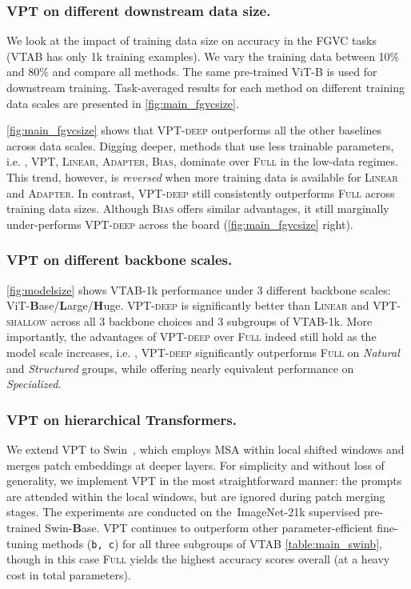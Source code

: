 \subsubsection{VPT on different downstream data size.}
\label{para:exp_datasize}
We look at the impact of training data size on accuracy in the FGVC tasks (VTAB has only 1k training examples). We vary the training data between 10\% and 80\% and compare all methods. The same pre-trained ViT-B is used for downstream training. Task-averaged results for each method on different training data scales are presented in \ref{fig:main_fgvcsize}.

\ref{fig:main_fgvcsize} shows that \textsc{VPT}-\textsc{deep} outperforms all the other baselines across data scales. Digging deeper, methods that use less trainable parameters, i.e. , \textsc{VPT}, \textsc{Linear}, \textsc{Adapter}, \textsc{Bias}, dominate over \textsc{Full} in the low-data regimes. This trend, however, is \emph{reversed} when more training data is available for \textsc{Linear} and \textsc{Adapter}. 
In contrast, \textsc{VPT}-\textsc{deep} still consistently outperforms \textsc{Full} across training data sizes. Although \textsc{Bias} offers similar advantages, it still marginally under-performs \textsc{VPT}-\textsc{deep} across the board (\ref{fig:main_fgvcsize} right).

\subsubsection{VPT on different backbone scales.}
\ref{fig:modelsize} shows VTAB-1k performance under 3 different backbone scales: ViT-\textbf{B}ase/\textbf{L}arge/\textbf{H}uge.
\textsc{VPT}-\textsc{deep} is significantly better than \textsc{Linear} and \textsc{VPT}-\textsc{shallow} across all 3 backbone choices and 3 subgroups of VTAB-1k. More importantly, the advantages of \textsc{VPT}-\textsc{deep} over \textsc{Full} indeed still hold as the model scale increases, i.e. , \textsc{VPT}-\textsc{deep} significantly outperforms \textsc{Full} on \textit{Natural} and \textit{Structured} groups, while offering nearly equivalent performance on \textit{Specialized}.

\subsubsection{VPT on hierarchical Transformers.} We extend \textsc{VPT} to Swin~\cite{liu2021swin}, which employs MSA within local shifted windows and merges patch embeddings at deeper layers. For simplicity and without loss of generality, we implement VPT in the most straightforward manner: the prompts are attended within the local windows, but are ignored during patch merging stages. The experiments are conducted on the~ImageNet-21k supervised pre-trained Swin-\textbf{B}ase. 
\textsc{VPT} continues to outperform other parameter-efficient fine-tuning methods (\texttt{b, c}) for all three subgroups of VTAB \ref{table:main_swinb}, though in this case \textsc{Full} yields the highest accuracy scores overall (at a heavy cost in total parameters). 


